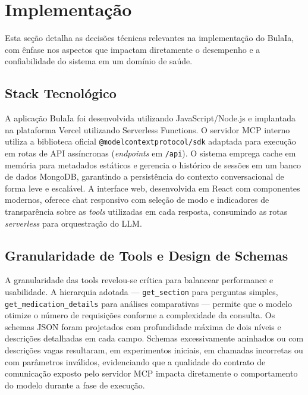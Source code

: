 \documentclass[12pt]{article}
\begin{document}
\FloatBarrier


\section{Implementação}
\label{sec:implementacao}

Esta seção detalha as decisões técnicas relevantes na implementação do BulaIa, com ênfase nos aspectos que impactam diretamente o desempenho e a confiabilidade do sistema em um domínio de saúde.

\subsection{Stack Tecnológico}

A aplicação BulaIa foi desenvolvida utilizando JavaScript/Node.js e implantada na plataforma Vercel utilizando Serverless Functions. O servidor MCP interno utiliza a biblioteca oficial \texttt{@modelcontextprotocol/sdk} adaptada para execução em rotas de API assíncronas (\textit{endpoints} em \texttt{/api}). O sistema emprega cache em memória para metadados estáticos e gerencia o histórico de sessões em um banco de dados MongoDB, garantindo a persistência do contexto conversacional de forma leve e escalável. A interface web, desenvolvida em React com componentes modernos, oferece chat responsivo com seleção de modo e indicadores de transparência sobre as \textit{tools} utilizadas em cada resposta, consumindo as rotas \textit{serverless} para orquestração do LLM.

\subsection{Granularidade de Tools e Design de Schemas}

A granularidade das tools revelou-se crítica para balancear performance e usabilidade. A hierarquia adotada --- \texttt{get\_section} para perguntas simples, \texttt{get\_medication\_details} para análises comparativas --- permite que o modelo otimize o número de requisições conforme a complexidade da consulta. Os schemas JSON foram projetados com profundidade máxima de dois níveis e descrições detalhadas em cada campo. Schemas excessivamente aninhados ou com descrições vagas resultaram, em experimentos iniciais, em chamadas incorretas ou com parâmetros inválidos, evidenciando que a qualidade do contrato de comunicação exposto pelo servidor MCP impacta diretamente o comportamento do modelo durante a fase de execução.
\end{document}
